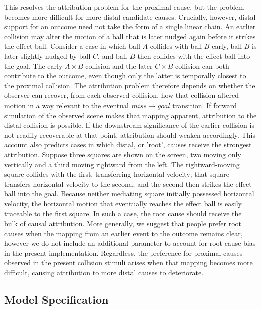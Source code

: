 \documentclass[10pt,letterpaper]{article}
\begin{document}
This resolves the attribution problem for the proximal cause, but the problem becomes more difficult for more distal candidate causes. Crucially, however, distal support for an outcome need not take the form of a single linear chain. An earlier collision may alter the motion of a ball that is later nudged again before it strikes the effect ball. Consider a case in which ball $A$ collides with ball $B$ early, ball $B$ is later slightly nudged by ball $C$, and ball $B$ then collides with the effect ball into the goal. The early $A \times B$ collision and the later $C \times B$ collision can both contribute to the outcome, even though only the latter is temporally closest to the proximal collision. The attribution problem therefore depends on whether the observer can recover, from each observed collision, how that collision altered motion in a way relevant to the eventual $miss \rightarrow goal$ transition. If forward simulation of the observed scene makes that mapping apparent, attribution to the distal collision is possible. If the downstream significance of the earlier collision is not readily recoverable at that point, attribution should weaken accordingly. This account also predicts cases in which distal, or 'root', causes receive the strongest attribution. Suppose three squares are shown on the screen, two moving only vertically and a third moving rightward from the left. The rightward-moving square collides with the first, transferring horizontal velocity; that square transfers horizontal velocity to the second; and the second then strikes the effect ball into the goal. Because neither mediating square initially possessed horizontal velocity, the horizontal motion that eventually reaches the effect ball is easily traceable to the first square. In such a case, the root cause should receive the bulk of causal attribution. More generally, we suggest that people prefer root causes when the mapping from an earlier event to the outcome remains clear, however we do not include an additional parameter to account for root-cause bias in the present implementation. Regardless, the preference for proximal causes observed in the present collision stimuli arises when that mapping becomes more difficult, causing attribution to more distal causes to deteriorate.

\subsection{Model Specification}
\end{document}
